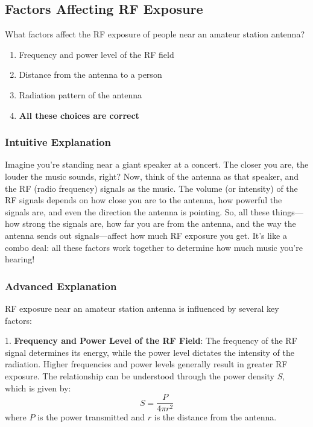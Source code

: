 \subsection{Factors Affecting RF Exposure}
\label{T0C04}

\begin{tcolorbox}[colback=gray!10!white,colframe=black!75!black,title=T0C04]
What factors affect the RF exposure of people near an amateur station antenna?
\begin{enumerate}[label=\Alph*]
    \item Frequency and power level of the RF field
    \item Distance from the antenna to a person
    \item Radiation pattern of the antenna
    \item \textbf{All these choices are correct}
\end{enumerate}
\end{tcolorbox}

\subsubsection{Intuitive Explanation}
Imagine you're standing near a giant speaker at a concert. The closer you are, the louder the music sounds, right? Now, think of the antenna as that speaker, and the RF (radio frequency) signals as the music. The volume (or intensity) of the RF signals depends on how close you are to the antenna, how powerful the signals are, and even the direction the antenna is pointing. So, all these things—how strong the signals are, how far you are from the antenna, and the way the antenna sends out signals—affect how much RF exposure you get. It's like a combo deal: all these factors work together to determine how much music you're hearing!

\subsubsection{Advanced Explanation}
RF exposure near an amateur station antenna is influenced by several key factors:

1. \textbf{Frequency and Power Level of the RF Field}: The frequency of the RF signal determines its energy, while the power level dictates the intensity of the radiation. Higher frequencies and power levels generally result in greater RF exposure. The relationship can be understood through the power density \( S \), which is given by:
   \[
   S = \frac{P}{4\pi r^2}
   \]
   where \( P \) is the power transmitted and \( r \) is the distance from the antenna.

